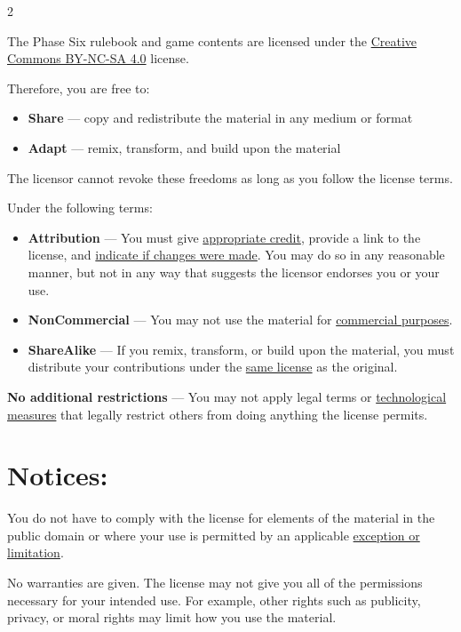 \label{ch:license}

\begin{multicols}{2}

The Phase Six rulebook and game contents are licensed under the \href{https://creativecommons.org/licenses/by-nc-sa/4.0/}{Creative Commons BY-NC-SA 4.0} license.

Therefore, you are free to:
\begin{itemize}
    \item \textbf{Share} — copy and redistribute the material in any medium or format
    \item \textbf{Adapt} — remix, transform, and build upon the material
\end{itemize}

The licensor cannot revoke these freedoms as long as you follow the license terms.

Under the following terms:
\begin{itemize}
    \item \textbf{Attribution} — You must give \href{https://creativecommons.org/licenses/by-nc-sa/4.0/\#ref-appropriate-credit}{appropriate credit}, provide a link to the license, and \href{https://creativecommons.org/licenses/by-nc-sa/4.0/\#ref-indicate-changes}{indicate if changes were made}. You may do so in any reasonable manner, but not in any way that suggests the licensor endorses you or your use.
    \item \textbf{NonCommercial} — You may not use the material for \href{https://creativecommons.org/licenses/by-nc-sa/4.0/\#ref-commercial-purposes}{commercial purposes}.
    \item \textbf{ShareAlike} — If you remix, transform, or build upon the material, you must distribute your contributions under the \href{https://creativecommons.org/licenses/by-nc-sa/4.0/\#ref-same-license}{same license} as the original.
\end{itemize}

\textbf{No additional restrictions} — You may not apply legal terms or \href{https://creativecommons.org/licenses/by-nc-sa/4.0/\#ref-technological-measures}{technological measures} that legally restrict others from doing anything the license permits.

\section*{Notices:}

You do not have to comply with the license for elements of the material in the public domain or where your use is permitted by an applicable \href{https://creativecommons.org/licenses/by-nc-sa/4.0/\#ref-exception-or-limitation}{exception or limitation}.

No warranties are given. The license may not give you all of the permissions necessary for your intended use. For example, other rights such as publicity, privacy, or moral rights may limit how you use the material.
\end{multicols}
